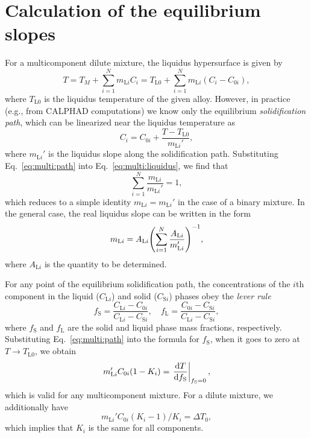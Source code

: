 \documentclass{article}
\newcommand{\liq}{\text{L}}
\newcommand{\sol}{\text{S}}
\begin{document}
\appendix

\section{Calculation of the equilibrium slopes}

For a multicomponent dilute mixture, the liquidus hypersurface is given by
\begin{equation}\label{eq:multi:liquidus}
    T = T_M + \sum_{i=1}^N m_{\liq i} C_i = T_{\liq0} + \sum_{i=1}^N m_{\liq i} (C_i - C_{0i}),
\end{equation}
where $T_{\liq0}$ is the liquidus temperature of the given alloy.
However, in practice (e.g., from CALPHAD computations) we know only the equilibrium \emph{solidification path},
which can be linearized near the liquidus temperature as
\begin{equation}\label{eq:multi:path}
    C_i = C_{0i} + \frac{T - T_{\liq0}}{m_{\liq i}'},
\end{equation}
where $m_{\liq i}'$ is the liquidus slope along the solidification path.
Substituting Eq.~\eqref{eq:multi:path} into Eq.~\eqref{eq:multi:liquidus}, we find that
\begin{equation}\label{eq:multi:slopes}
    \sum_{i=1}^N \frac{m_{\liq i}}{m_{\liq i}'} = 1,
\end{equation}
which reduces to a simple identity $m_{\liq i} = m_{\liq i}'$ in the case of a binary mixture.
In the general case, the real liquidus slope can be written in the form
\begin{equation}\label{eq:multi:A_Li}
    m_{\liq i} = A_{\liq i} \qty(\sum_{i=1}^N \frac{A_{\liq i}}{m_{\liq i}'})^{-1},
\end{equation}
where $A_{\liq i}$ is the quantity to be determined.

For any point of the equilibrium solidification path, the concentrations of the $i$th component
in the liquid ($C_{\liq i}$) and solid ($C_{\sol i}$) phases obey the \emph{lever rule}
\begin{equation}\label{eq:multi:lever}
    f_\sol = \frac{C_{\liq i} - C_{0i}}{C_{\liq i} - C_{\sol i}}, \quad
    f_\liq = \frac{C_{0i} - C_{\sol i}}{C_{\liq i} - C_{\sol i}},
\end{equation}
where $f_\sol$ and $f_\liq$ are the solid and liquid phase mass fractions, respectively.
Substituting Eq.~\eqref{eq:multi:path} into the formula for $f_\sol$,
when it goes to zero at $T\to T_{\liq0}$, we obtain
\begin{equation}\label{eq:multi:dTdfs}
    m_{\liq i}'C_{0i}(1-K_i) = \eval{\dv{T}{f_\sol}}_{f_\sol=0},
\end{equation}
which is valid for any multicomponent mixture.
For a dilute mixture, we additionally have
\begin{equation}\label{eq:multi:deltaT-dilute}
    m_{\liq i}'C_{0i}(K_i-1)/K_i = \Delta{T}_0,
\end{equation}
which implies that $K_i$ is the same for all components.
\end{document}
